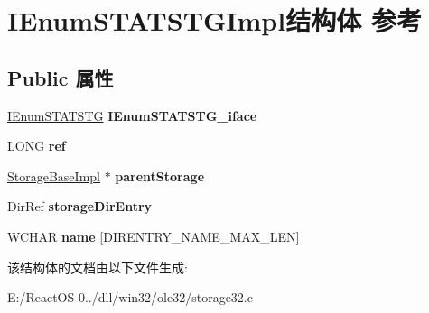 \hypertarget{struct_i_enum_s_t_a_t_s_t_g_impl}{}\section{I\+Enum\+S\+T\+A\+T\+S\+T\+G\+Impl结构体 参考}
\label{struct_i_enum_s_t_a_t_s_t_g_impl}
\subsection*{Public 属性}
\begin{DoxyCompactItemize}
\item 
\mbox{\label{struct_i_enum_s_t_a_t_s_t_g_impl_aaf29baeeb0ad80fb9dbe67411beca923}} 
\hyperlink{interface_i_enum_s_t_a_t_s_t_g}{I\+Enum\+S\+T\+A\+T\+S\+TG} {\bfseries I\+Enum\+S\+T\+A\+T\+S\+T\+G\+\_\+iface}
\item 
\mbox{\label{struct_i_enum_s_t_a_t_s_t_g_impl_aa676ebdbd78df5e87e9809af270eda1c}} 
L\+O\+NG {\bfseries ref}
\item 
\mbox{\label{struct_i_enum_s_t_a_t_s_t_g_impl_aca8ea28414656ed6971d3ed3ac9e52f0}} 
\hyperlink{struct_storage_base_impl}{Storage\+Base\+Impl} $\ast$ {\bfseries parent\+Storage}
\item 
\mbox{\label{struct_i_enum_s_t_a_t_s_t_g_impl_aec1cc4cdb7b2de47cc05f05681245fb8}} 
Dir\+Ref {\bfseries storage\+Dir\+Entry}
\item 
\mbox{\label{struct_i_enum_s_t_a_t_s_t_g_impl_ad1b7343d490f8ea619b2bbc92d6958a4}} 
W\+C\+H\+AR {\bfseries name} \mbox{[}D\+I\+R\+E\+N\+T\+R\+Y\+\_\+\+N\+A\+M\+E\+\_\+\+M\+A\+X\+\_\+\+L\+EN\mbox{]}
\end{DoxyCompactItemize}


该结构体的文档由以下文件生成\+:\begin{DoxyCompactItemize}
\item 
E\+:/\+React\+O\+S-\/0../dll/win32/ole32/storage32.\+c\end{DoxyCompactItemize}
